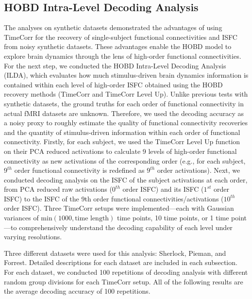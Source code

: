 \documentclass[11pt]{article}
\begin{document}
\begin{enumerate}
\clearpage
\newpage
\subsection{HOBD Intra-Level Decoding Analysis}
The analyses on synthetic datasets demonstrated the advantages of using TimeCorr for the recovery of single-subject functional connectivities and ISFC from noisy synthetic datasets. These advantages enable the HOBD model to explore brain dynamics through the lens of high-order functional connectivities. For the next step, we conducted the HOBD Intra-Level Decoding Analysis (ILDA), which evaluates how much stimulus-driven brain dynamics information is contained within each level of high-order ISFC obtained using the HOBD recovery methods (TimeCorr and TimeCorr Level Up). Unlike previous tests with synthetic datasets, the ground truths for each order of functional connectivity in actual fMRI datasets are unknown. Therefore, we used the decoding accuracy as a noisy proxy to roughly estimate the quality of functional connectivity recoveries and the quantity of stimulus-driven information within each order of functional connectivity. Firstly, for each subject, we used the TimeCorr Level Up function on their PCA reduced activations to calculate 9 levels of high-order functional connectivity as new activations of the corresponding order (e.g., for each subject, $9^{th}$ order functional connectivity is redefined as $9^{th}$ order activations). Next, we conducted decoding analysis on the ISFC of the subject activations at each order, from PCA reduced raw activations ($0^{th}$ order ISFC) and its ISFC ($1^{st}$ order ISFC) to the ISFC of the 9th order functional connectivities/activations ($10^{th}$ order ISFC). Three TimeCorr setups were implemented---each with Gaussian variances of $\text{min}(1000,\text{time length})$ time points, 10 time points, or 1 time point---to comprehensively understand the decoding capability of each level under varying resolutions.

Three different datasets were used for this analysis: Sherlock, Pieman, and Forrest. Detailed descriptions for each dataset are included in each subsection. For each dataset, we conducted 100 repetitions of decoding analysis with different random group divisions for each TimeCorr setup. All of the following results are the average decoding accuracy of 100 repetitions.


\end{enumerate}
\end{document}
